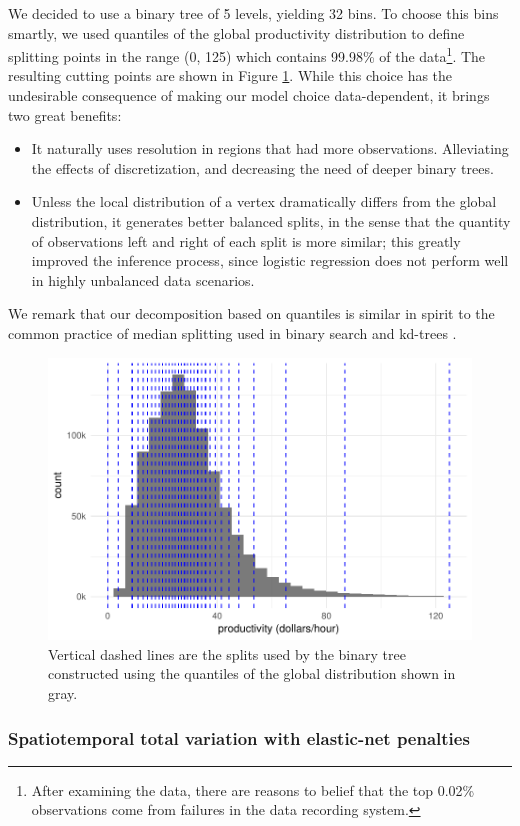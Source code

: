 \documentclass[11pt]{article}
\begin{document}
We decided to use a binary tree of 5 levels, yielding 32 bins. To choose this bins smartly, we used quantiles of the global productivity distribution to define splitting points in the range (0, 125) which contains 99.98\% of the data\footnote{After examining the data, there are reasons to belief that the top 0.02\% observations come from failures in the data recording system.}. The resulting cutting points are shown in Figure \ref{fig:splits}. While this choice has the undesirable consequence of making our model choice data-dependent, it brings two great benefits:
\begin{itemize}
    \itemsep0em
    \item It naturally uses resolution in regions that had more observations. Alleviating the effects of discretization, and decreasing the need of deeper binary trees.
    \item Unless the local distribution of a vertex dramatically differs from the global distribution, it generates better balanced splits, in the sense that the quantity of observations left and right of each split is more similar; this greatly improved the inference process, since logistic regression does not perform well in highly unbalanced data scenarios.
\end{itemize}
We remark that our decomposition based on quantiles is similar in spirit to the common practice of median splitting used in binary search and kd-trees \citep{bentley-1975}.

\begin{figure}[htb]
    \centering
    \includegraphics[width=0.55\linewidth]{img/splits.pdf}
    \caption{Vertical dashed lines are the splits used by the binary tree constructed using the quantiles of the global distribution shown in gray.}
    \label{fig:splits}
\end{figure}

\subsubsection{Spatiotemporal total variation with elastic-net penalties}
\end{document}
